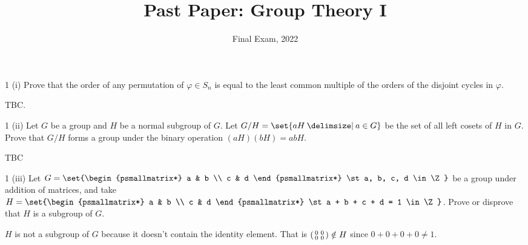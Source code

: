 \documentclass[11pt]{penrose}
\title{Past Paper: Group Theory I}
\subtitle{Final Exam, 2022}
\begin{document}
\maketitle
\warningtext

\begin{problem}{1 (i)}
    Prove that the order of any permutation of $\varphi \in S_n$ is equal to the least common multiple of the orders of the disjoint cycles in $\varphi$.

    \solution TBC.
\end{problem}

\begin{problem}{1 (ii)}
    Let $G$ be a group and $H$ be a normal subgroup of $G$. Let $G/H = \set{aH \st a \in G}$ be the set of all left cosets of $H$ in $G$. Prove that $G/H$ forms a group under the binary operation $(aH)(bH) = abH$.

    \solution TBC
\end{problem}

\begin{problem}{1 (iii)}
    Let $G = \set{\begin{psmallmatrix*} a & b \\ c & d \end{psmallmatrix*} \st a, b, c, d \in \Z}$ be a group under addition of matrices, and take $H = \set{\begin{psmallmatrix*} a & b \\ c & d \end{psmallmatrix*} \st a + b + c + d = 1 \in \Z}$. Prove or disprove that $H$ is a subgroup of $G$.

    \solution $H$ is not a subgroup of $G$ because it doesn't contain the identity element. That is $\begin{psmallmatrix*} 0 & 0 \\ 0 & 0 \end{psmallmatrix*} \notin H$ since $0 + 0 + 0 + 0  \neq 1$.
\end{problem}
\end{document}
